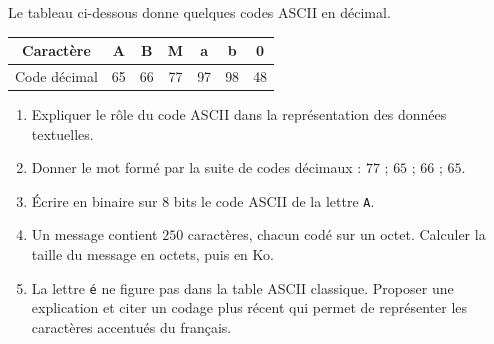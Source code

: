 \documentclass[11pt]{article}
\begin{document}
\begin{exercice}
Le tableau ci-dessous donne quelques codes ASCII en décimal.

\begin{center}
\begin{tabular}{|c|c|c|c|c|c|c|}
\hline
Caractère & A & B & M & a & b & 0 \\
\hline
Code décimal & 65 & 66 & 77 & 97 & 98 & 48 \\
\hline
\end{tabular}
\end{center}

\begin{enumerate}
\item Expliquer le rôle du code ASCII dans la représentation des données textuelles.
\item Donner le mot formé par la suite de codes décimaux : $77$ ; $65$ ; $66$ ; $65$.
\item Écrire en binaire sur $8$ bits le code ASCII de la lettre \texttt{A}.
\item Un message contient $250$ caractères, chacun codé sur un octet. Calculer la taille du message en octets, puis en Ko.
\item La lettre \texttt{é} ne figure pas dans la table ASCII classique. Proposer une explication et citer un codage plus récent qui permet de représenter les caractères accentués du français.
\end{enumerate}
\end{exercice}
\end{document}
